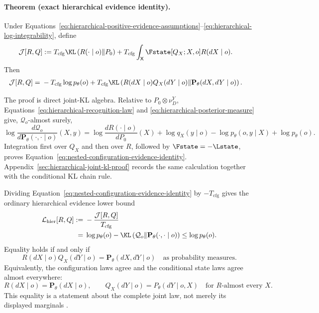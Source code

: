 \paragraph{Theorem (exact hierarchical evidence identity).}
Under Equations~\eqref{eq:hierarchical-positive-evidence-assumptions}--\eqref{eq:hierarchical-log-integrability}, define
\begin{align}
\mathcal J[R,Q]
:={}&T_{\mathrm{cfg}}
\KL\left(R(\mathord\cdot\mid o)\middle\Vert P_0\right)
+T_{\mathrm{cfg}}
\int_{\mathsf X}
\Fstate[Q_X;X,o]R(dX\mid o).
\label{eq:nested-configuration-objective}
\end{align}
Then
\begin{align}
\mathcal J[R,Q]
={}&-T_{\mathrm{cfg}}\log p_\theta(o)
+T_{\mathrm{cfg}}
\KL\left(
R(dX\mid o)Q_X(dY\mid o)
\middle\Vert
\mathbf P_\theta(dX,dY\mid o)
\right).
\label{eq:nested-configuration-evidence-identity}
\end{align}

The proof is direct joint-KL algebra. Relative to \(P_0\otimes\nu_D^Y\), Equations~\eqref{eq:hierarchical-recognition-law} and \eqref{eq:hierarchical-posterior-measure} give, \(\mathcal Q_o\)-almost surely,
\begin{equation}
\log\frac{d\mathcal Q_o}
{d\mathbf P_\theta(\mathord\cdot,\mathord\cdot\mid o)}(X,y)
=\log\frac{dR(\mathord\cdot\mid o)}{dP_0}(X)
+\log q_X(y\mid o)
-\log p_\theta(o,y\mid X)
+\log p_\theta(o).
\label{eq:hierarchical-joint-log-ratio}
\end{equation}
Integration first over \(Q_X\) and then over \(R\), followed by
\(\Fstate=-\Lstate\), proves Equation~\eqref{eq:nested-configuration-evidence-identity}. Appendix~\ref{sec:hierarchical-joint-kl-proof} records the same calculation together with the conditional KL chain rule.

Dividing Equation~\eqref{eq:nested-configuration-evidence-identity} by \(-T_{\mathrm{cfg}}\) gives the ordinary hierarchical evidence lower bound
\begin{align}
\mathcal L_{\mathrm{hier}}[R,Q]
:={}&-\frac{\mathcal J[R,Q]}{T_{\mathrm{cfg}}}
\label{eq:hierarchical-elbo-definition}\\
={}&\log p_\theta(o)
-\KL\left(
\mathcal Q_o
\middle\Vert
\mathbf P_\theta(\mathord\cdot,\mathord\cdot\mid o)
\right)
\leq\log p_\theta(o).
\label{eq:hierarchical-elbo-gap}
\end{align}
Equality holds if and only if
\begin{equation}
R(dX\mid o)Q_X(dY\mid o)
=\mathbf P_\theta(dX,dY\mid o)
\quad\text{as probability measures}.
\label{eq:hierarchical-elbo-equality-condition}
\end{equation}
Equivalently, the configuration laws agree and the conditional state laws agree almost everywhere:
\begin{equation}
R(dX\mid o)=\mathbf P_\theta(dX\mid o),
\qquad
Q_X(dY\mid o)=P_\theta(dY\mid o,X)
\quad\text{for \(R\)-almost every \(X\)}.
\label{eq:hierarchical-elbo-component-equality}
\end{equation}
This equality is a statement about the complete joint law, not merely its displayed marginals \citep{Kullback1951,Csiszar1967,CoverThomas2006}.

